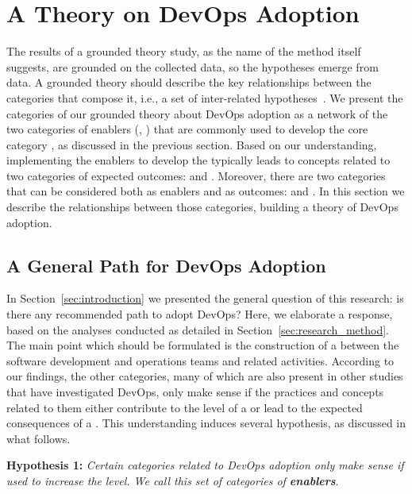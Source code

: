 \section{A Theory on DevOps Adoption} \label{sec:results}

The results of a grounded theory study, as the name of the method itself
suggests, are grounded on the collected data, so the hypotheses emerge from
data. A grounded theory should describe the key relationships between the
categories that compose it, i.e., a set of inter-related hypotheses~\cite{hoda2017becoming}.
We present the categories of our grounded theory
about DevOps adoption as a network of the two categories of enablers (,
) that are commonly used to develop the core category
\cc, as discussed in the previous section. Based on our understanding,
implementing the enablers to develop the \cc typically leads
to concepts related to two categories of expected outcomes:
 and . Moreover, there are two categories that can be considered
both as enablers and as outcomes:  and .
In this section we describe the relationships between those categories, building a theory
of DevOps adoption.

\subsection{A General Path for DevOps Adoption}

In Section~\ref{sec:introduction} we presented the general question of this
research: is there any recommended path to adopt DevOps? Here, we elaborate a response,
based on the analyses conducted as detailed in Section~\ref{sec:research_method}. The main
point which should be formulated is the construction of a  between the software development and operations teams and
related activities. According to our findings, the other categories,
many of which are also present in other studies that have investigated DevOps,
only make sense if the practices and
concepts related to them either contribute to the level of a \cc or lead to the expected consequences
of a \cc. This understanding induces several hypothesis, as discussed in
what follows.

\begin{mh}
\textbf{Hypothesis 1:} \textit{Certain categories related to DevOps adoption
only make sense if used to increase the} \cc \emph{level. We
call this set of categories of \textbf{enablers}}.
\end{mh}

